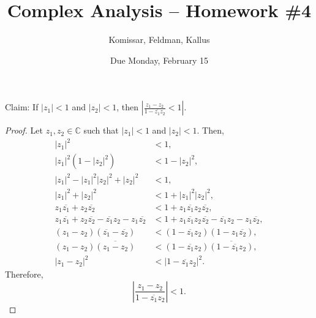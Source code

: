 \documentclass[11pt]{article}       %
\title{Complex Analysis -- Homework \#4}
\author{ Komissar, Feldman, Kallus }
\date{ Due Monday, February 15 }
\theoremstyle{definition}
\begin{document}
\pagecolor{black}
\color{white}
\maketitle

 Claim: If $|z_1| < 1$ and $|z_2| < 1$, then $\left| \frac{z_1 - z_2}{1 - \overline{z_1}z_2} < 1 \right|$.
\begin{proof}
    Let $z_1, z_2 \in \mathbb C$ such that $|z_1| < 1$ and $|z_2| < 1$.
    Then,
    \begin{align*}
        |z_1|^2 &< 1, \\
        |z_1|^2(1-|z_2|^2) &< 1 - |z_2|^2, \\
        |z_1|^2 - |z_1|^2|z_2|^2 + |z_2|^2 &< 1, \\
        |z_1|^2 + |z_2|^2 &< 1 + |z_1|^2|z_2|^2, \\
        z_1\overline{z_1} + z_2\overline{z_2} &< 1 + z_1\overline{z_1}z_2\overline{z_2}, \\
        z_1\overline{z_1} + z_2\overline{z_2} - \overline{z_1}z_2 - z_1\overline{z_2} &< 1 + z_1\overline{z_1}z_2\overline{z_2} - \overline{z_1}z_2 - z_1\overline{z_2}, \\
        (z_1 - z_2)(\overline{z_1} - \overline{z_2}) &< (1 - \overline{z_1}z_2)(1 - z_1\overline{z_2}), \\
        (z_1 - z_2)\overline{(z_1 - z_2)} &< (1 - \overline{z_1}z_2)\overline{(1 - \overline{z_1}z_2)}, \\
        |z_1 - z_2|^2 &< |1-\overline{z_1}z_2|^2.
    \end{align*}
    Therefore, $$\left|\frac{z_1 - z_2}{1-\overline{z_1}z_2}\right| < 1.$$
\end{proof}
\end{document}
